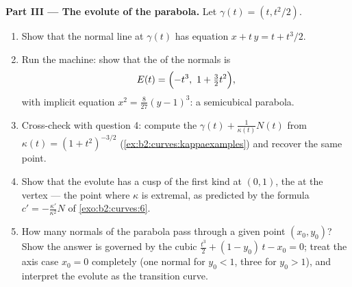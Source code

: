 \begin{problem}
\medskip
\noindent\textbf{Part III --- The evolute of the parabola.}
Let $\gamma(t) = (t, t^2/2)$.
\begin{enumerate}[resume]
  \item Show that the normal line at $\gamma(t)$ has equation
        $x + t\,y = t + t^3/2$.
  \item Run the  machine: show that the  of
        the normals is
        \[
        E(t) = \Bigl(-t^3,\ 1 + \tfrac32 t^2\Bigr),
        \]
        with implicit equation $x^2 = \tfrac8{27}(y - 1)^3$:
        a semicubical parabola.
  \item Cross-check with question 4: compute the  $\gamma(t) + \frac1{\kappa(t)}N(t)$ from
        $\kappa(t) = (1 + t^2)^{-3/2}$
        (\cref{ex:b2:curves:kappaexamples}) and recover the
        same point.
  \item Show that the evolute has a cusp of the first kind at
        $(0, 1)$, the  at the vertex ---
        the point where $\kappa$ is extremal, as predicted by
        the formula $c' = -\frac{\kappa'}{\kappa^2}N$ of
        \cref{exo:b2:curves:6}.
  \item How many normals of the parabola pass through a given
        point $(x_0, y_0)$? Show the answer is governed by
        the cubic $\tfrac{t^3}2 + (1 - y_0)\,t - x_0 = 0$;
        treat the axis case $x_0 = 0$ completely (one normal
        for $y_0 < 1$, three for $y_0 > 1$), and interpret
        the evolute as the transition curve.
\end{enumerate}


\end{problem}

